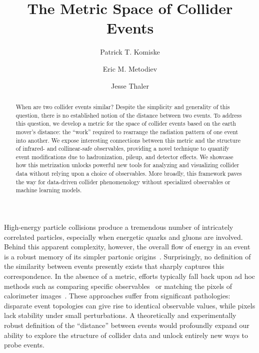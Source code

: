 \documentclass[aps,prl,twocolumn,preprintnumbers,nofootinbib,longbibliography,floatfix]{revtex4-1}
\begin{document}
\title{The Metric Space of Collider Events}

\author{Patrick T. Komiske}

\author{Eric M. Metodiev}

\author{Jesse Thaler}


\begin{abstract}
When are two collider events similar?
%
Despite the simplicity and generality of this question, there is no established notion of the distance between two events.
%
To address this question, we develop a metric for the space of collider events based on the earth mover's distance: the ``work'' required to rearrange the radiation pattern of one event into another.
%
We expose interesting connections between this metric and the structure of infrared- and collinear-safe observables, providing a novel technique to quantify event modifications due to hadronization, pileup, and detector effects.
%
We showcase how this metrization unlocks powerful new tools for analyzing and visualizing collider data without relying upon a choice of observables.
%
More broadly, this framework paves the way for data-driven collider phenomenology without specialized observables or machine learning models.
\end{abstract}


\maketitle


High-energy particle collisions produce a tremendous number of intricately correlated particles, especially when energetic quarks and gluons are involved.
%
Behind this apparent complexity, however, the overall flow of energy in an event is a robust memory of its simpler partonic origins~\cite{Sterman:1977wj,Georgi:1977sf,Donoghue:1979vi,Altarelli:1981ax,Dokshitzer:1991eq,Tkachov:1995kk,Sveshnikov:1995vi,Hofman:2008ar}.
%
Surprisingly, no definition of the similarity between events presently exists that sharply captures this correspondence.
%
In the absence of a metric, efforts typically fall back upon ad hoc methods such as comparing specific observables~\cite{Cacciari:2007fd,Cacciari:2014gra,Bertolini:2014bba,Martinez:2018fwc,Komiske:2017ubm} or matching the pixels of calorimeter images~\cite{Komiske:2017ubm,Cogan:2014oua,deOliveira:2015xxd,Paganini:2017hrr,Paganini:2017dwg}.
%
These approaches suffer from significant pathologies: disparate event topologies can give rise to identical observable values, while pixels lack stability under small perturbations.
%
A theoretically and experimentally robust definition of the ``distance'' between events would profoundly expand our ability to explore the structure of collider data and unlock entirely new ways to probe events.
\end{document}
